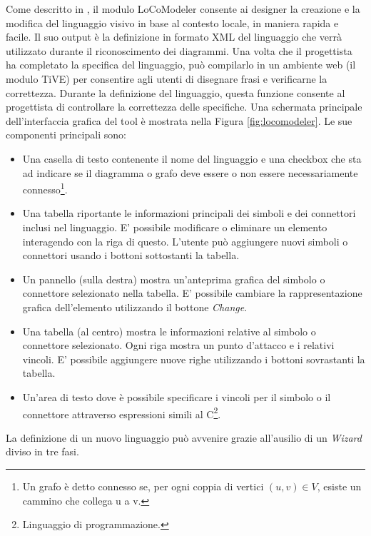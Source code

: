                 Come descritto in \cite{extending_localcontext}, il modulo LoCoModeler consente ai designer la creazione e la modifica del linguaggio visivo in base al contesto locale, in maniera rapida e facile. Il suo output è la definizione in formato XML del linguaggio che verrà utilizzato durante il riconoscimento dei diagrammi. Una volta che il progettista ha completato la specifica del linguaggio, può compilarlo in un ambiente web (il modulo TiVE) per consentire agli utenti di disegnare frasi e verificarne la correttezza. Durante la definizione del linguaggio, questa funzione consente al progettista di controllare la correttezza delle specifiche.
                \newline
                Una schermata principale dell'interfaccia grafica del tool è mostrata nella Figura \ref{fig:locomodeler}. Le sue componenti principali sono:
                \begin{itemize}
                    \item Una casella di testo contenente il nome del linguaggio e una checkbox che sta ad indicare se il diagramma o grafo deve essere o non essere necessariamente connesso\footnote{Un grafo è detto connesso se, per ogni coppia di vertici $(u, v)\in{V}$, esiste un cammino che collega u a v.}.
                    \item Una tabella riportante le informazioni principali dei simboli e dei connettori inclusi nel linguaggio. E' possibile modificare o eliminare un elemento interagendo con la riga di questo. L'utente può aggiungere nuovi simboli o connettori usando i bottoni sottostanti la tabella.
                    \item Un pannello (sulla destra) mostra un'anteprima grafica del simbolo o connettore selezionato nella tabella. E' possibile cambiare la rappresentazione grafica dell'elemento utilizzando il bottone \textit{Change}.
                    \item Una tabella (al centro) mostra le informazioni relative al simbolo o connettore selezionato. Ogni riga mostra un punto d'attacco e i relativi vincoli. E' possibile aggiungere nuove righe utilizzando i bottoni sovrastanti la tabella.
                    \item Un'area di testo dove è possibile specificare i vincoli per il simbolo o il connettore attraverso espressioni simili al C\footnote{Linguaggio di programmazione.}.
                \end{itemize}
                La definizione di un nuovo linguaggio può avvenire grazie all'ausilio di un \textit{Wizard} diviso in tre fasi.

